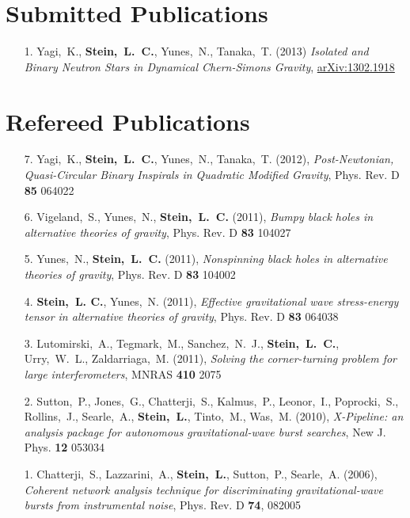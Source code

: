 
\section{\sc Submitted Publications}
\begin{enumerate}
\item[{1.}] Yagi,~K., {\bf Stein,~L.~C.}, Yunes,~N., Tanaka,~T. (2013)
  {\it Isolated and Binary Neutron Stars in Dynamical Chern-Simons
    Gravity}, \href{http://arxiv.org/abs/1302.1918}{arXiv:1302.1918}
\end{enumerate}

\section{\sc Refereed Publications}
\begin{enumerate}
\item[{7.}] Yagi,~K., {\bf Stein,~L.~C.}, Yunes,~N.,
  Tanaka,~T. (2012), {\it Post-Newtonian, Quasi-Circular Binary
    Inspirals in Quadratic Modified Gravity}, Phys. Rev. D {\bf 85} 064022
\item[{6.}] Vigeland,~S., Yunes,~N., {\bf Stein,~L.~C.} (2011), {\it
    Bumpy black holes in alternative theories of gravity},
  Phys. Rev. D {\bf 83} 104027
\item[{5.}] Yunes,~N., {\bf Stein,~L.~C.} (2011), {\it Nonspinning
    black holes in alternative theories of gravity},
  Phys. Rev. D {\bf 83} 104002
\item[{4.}] {\bf Stein,~L. C.}, Yunes,~N. (2011), {\it Effective
    gravitational wave stress-energy tensor in alternative theories of
    gravity}, Phys. Rev. D {\bf 83} 064038
\item[{3.}] Lutomirski,~A., Tegmark,~M., Sanchez,~N.~J., {\bf
    Stein,~L.~C.},
  Urry,~W.~L., Zaldarriaga,~M. (2011), {\it Solving the
    corner-turning problem for large interferometers}, MNRAS {\bf 410} 2075
\item[{2.}] Sutton,~P., Jones,~G., Chatterji,~S., Kalmus,~P., Leonor,~I.,
  Poprocki,~S., Rollins,~J., Searle,~A., {\bf Stein,~L.}, Tinto,~M.,
  Was,~M. (2010), {\it X-Pipeline: an analysis package for autonomous
    gravitational-wave burst searches}, New J. Phys. {\bf 12} 053034
\item[{1.}] Chatterji,~S., Lazzarini,~A., {\bf Stein,~L.}, Sutton,~P.,
  Searle,~A. (2006), {\it Coherent network analysis technique for
    discriminating gravitational-wave bursts from instrumental noise},
  Phys. Rev. D {\bf 74}, 082005
\end{enumerate}

